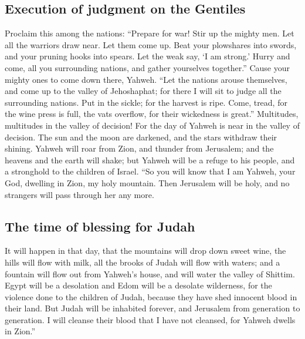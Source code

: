 \hypertarget{execution-of-judgment-on-the-gentiles}{%
\subsection{Execution of judgment on the
Gentiles}\label{execution-of-judgment-on-the-gentiles}}

 Proclaim this among the nations: ``Prepare for war! Stir
up the mighty men. Let all the warriors draw near. Let them come up.
 Beat your plowshares into swords, and your pruning hooks
into spears. Let the weak say, `I am strong.'  Hurry and
come, all you surrounding nations, and gather yourselves together.''
Cause your mighty ones to come down there, Yahweh.  ``Let
the nations arouse themselves, and come up to the valley of Jehoshaphat;
for there I will sit to judge all the surrounding nations.
 Put in the sickle; for the harvest is ripe. Come, tread,
for the wine press is full, the vats overflow, for their wickedness is
great.''  Multitudes, multitudes in the valley of
decision! For the day of Yahweh is near in the valley of decision.
 The sun and the moon are darkened, and the stars
withdraw their shining.  Yahweh will roar from Zion, and
thunder from Jerusalem; and the heavens and the earth will shake; but
Yahweh will be a refuge to his people, and a stronghold to the children
of Israel.  ``So you will know that I am Yahweh, your
God, dwelling in Zion, my holy mountain. Then Jerusalem will be holy,
and no strangers will pass through her any more.

\hypertarget{the-time-of-blessing-for-judah}{%
\subsection{The time of blessing for
Judah}\label{the-time-of-blessing-for-judah}}

 It will happen in that day, that the mountains will drop
down sweet wine, the hills will flow with milk, all the brooks of Judah
will flow with waters; and a fountain will flow out from Yahweh's house,
and will water the valley of Shittim.  Egypt will be a
desolation and Edom will be a desolate wilderness, for the violence done
to the children of Judah, because they have shed innocent blood in their
land.  But Judah will be inhabited forever, and Jerusalem
from generation to generation.  I will cleanse their
blood that I have not cleansed, for Yahweh dwells in Zion.''
